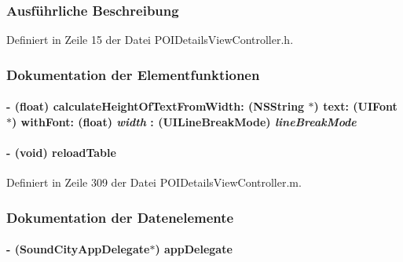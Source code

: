 \subsubsection{Ausführliche Beschreibung}


Definiert in Zeile 15 der Datei POIDetailsViewController.h.

\subsubsection{Dokumentation der Elementfunktionen}
\hypertarget{interface_p_o_i_details_view_controller_aecbd2dd213ae01d4c01c2bcb53da55d3}{
\paragraph[{calculateHeightOfTextFromWidth:text:withFont::}]{\setlength{\rightskip}{0pt plus 5cm}-\/ (float) calculateHeightOfTextFromWidth: (NSString $\ast$)\/ text: (UIFont $\ast$)\/ withFont: (float) {\em width}\/ : (UILineBreakMode) {\em lineBreakMode}}\hfill}
\label{interface_p_o_i_details_view_controller_aecbd2dd213ae01d4c01c2bcb53da55d3}
\hypertarget{interface_p_o_i_details_view_controller_a2c795e3ef76b754c8ff16f6334189472}{
\paragraph[{reloadTable}]{\setlength{\rightskip}{0pt plus 5cm}-\/ (void) reloadTable }\hfill}
\label{interface_p_o_i_details_view_controller_a2c795e3ef76b754c8ff16f6334189472}


Definiert in Zeile 309 der Datei POIDetailsViewController.m.

\subsubsection{Dokumentation der Datenelemente}
\hypertarget{interface_p_o_i_details_view_controller_a399b6acaa417e7921abf51b70de6fd22}{
\paragraph[{appDelegate}]{\setlength{\rightskip}{0pt plus 5cm}-\/ ({\bf SoundCityAppDelegate}$\ast$) {\bf appDelegate}}\hfill}
\label{interface_p_o_i_details_view_controller_a399b6acaa417e7921abf51b70de6fd22}


